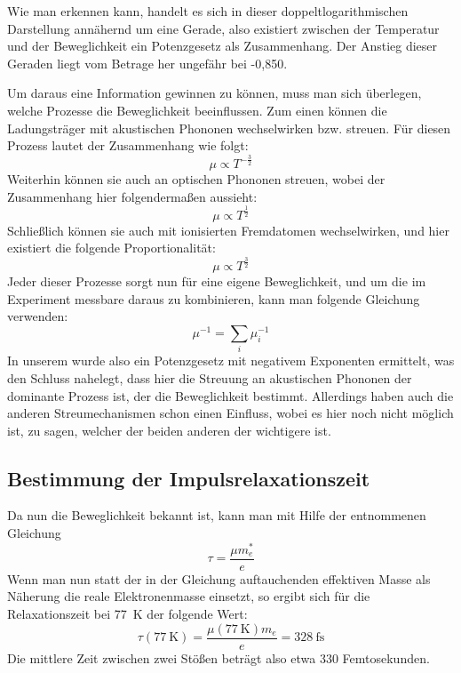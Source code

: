 Wie man erkennen kann, handelt es sich in dieser doppeltlogarithmischen
Darstellung annähernd um eine Gerade, also existiert zwischen der Temperatur
und der Beweglichkeit ein Potenzgesetz als Zusammenhang. Der Anstieg dieser
Geraden liegt vom Betrage her ungefähr bei -0,850.

Um daraus eine Information gewinnen zu können, muss man sich überlegen, welche
Prozesse die Beweglichkeit beeinflussen. Zum einen können die Ladungsträger mit
akustischen Phononen wechselwirken bzw. streuen. Für diesen Prozess lautet der
Zusammenhang wie folgt:
\begin{equation}
μ \propto T^{-\frac{3}{2}}
\end{equation}
Weiterhin können sie auch an optischen Phononen streuen, wobei der Zusammenhang
hier folgendermaßen aussieht:
\begin{equation}
μ \propto T^{\frac{1}{2}}
\end{equation}
Schließlich können sie auch mit ionisierten Fremdatomen wechselwirken, und hier
existiert die folgende Proportionalität:
\begin{equation}
μ \propto T^{\frac{3}{2}}
\end{equation}
Jeder dieser Prozesse sorgt nun für eine eigene Beweglichkeit, und um die im
Experiment messbare daraus zu kombinieren, kann man folgende Gleichung
verwenden:
\begin{equation}
μ^{-1} = \sum_i μ_i^{-1}
\end{equation}
In unserem wurde also ein Potenzgesetz mit negativem Exponenten ermittelt, was
den Schluss nahelegt, dass hier die Streuung an akustischen Phononen der
dominante Prozess ist, der die Beweglichkeit bestimmt. Allerdings haben auch
die anderen Streumechanismen schon einen Einfluss, wobei es hier noch nicht
möglich ist, zu sagen, welcher der beiden anderen der wichtigere ist.

\subsection{Bestimmung der Impulsrelaxationszeit}

Da nun die Beweglichkeit bekannt ist, kann man mit Hilfe der \cite[Gl.
(6.37)]{bergmann} entnommenen Gleichung
\begin{equation}
τ = \frac{μm^{\ast}_e}{e}
\end{equation}
Wenn man nun statt der in der Gleichung auftauchenden effektiven Masse als
Näherung die reale Elektronenmasse einsetzt, so ergibt sich für die
Relaxationszeit bei \SI{77}{\kelvin} der folgende Wert:
\begin{equation}
τ(\SI{77}{\kelvin}) = \frac{μ(\SI{77}{\kelvin})m_e}{e}= \SI{328}{\femto\second}
\end{equation}
Die mittlere Zeit zwischen zwei Stößen beträgt also etwa 330 Femtosekunden. 